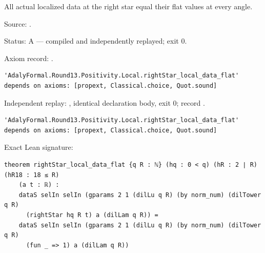 \begin{theorem}[bp-447]
\label{bp-447}
\uses{}
\leanok
All actual localized data at the right star equal their flat values at every angle.

\par Source: \texttt{}.
\par Status: A — compiled and independently replayed; exit 0.
\par Axiom record: \texttt{}.
\begin{verbatim}
'AdalyFormal.Round13.Positivity.Local.rightStar_local_data_flat' depends on axioms: [propext, Classical.choice, Quot.sound]
\end{verbatim}
\par Independent replay: \texttt{}, identical declaration body, exit 0; record \texttt{}.
\begin{verbatim}
'AdalyFormal.Round13.Positivity.Local.rightStar_local_data_flat' depends on axioms: [propext, Classical.choice, Quot.sound]
\end{verbatim}
\par Exact Lean signature:
\begin{verbatim}
theorem rightStar_local_data_flat {q R : ℕ} (hq : 0 < q) (hR : 2 ∣ R) (hR18 : 18 ≤ R)
    (a t : ℝ) :
    dataS selIn selIn (gparams 2 1 (dilLu q R) (by norm_num) (dilTower q R)
      (rightStar hq R t) a (dilLam q R)) =
    dataS selIn selIn (gparams 2 1 (dilLu q R) (by norm_num) (dilTower q R)
      (fun _ => 1) a (dilLam q R))
\end{verbatim}
\end{theorem}

